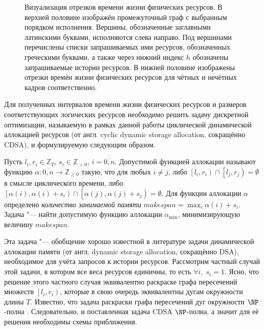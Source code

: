 \begin{figure*}[ht]
\caption{Визуализация отрезков времени жизни физических ресурсов.
В верхней половине изображён промежуточный граф с выбранным порядком исполнения.
Вершины, обозначенные заглавными латинскими буквами, исполняются слева направо.
Под вершинами перечислены списки запрашиваемых ими ресурсов, обозначенных греческими буквами, а также через нижний индекс $h$ обозначены запрашиваемые истории ресурсов.
В нижней половине изображены отрезки времён жизни физических ресурсов для чётных и нечётных кадров соответственно.}
\label{fig:twoFrameLifetime}
\end{figure*}
Для полученных интервалов времени жизни физических ресурсов и размеров соответствующих логических ресурсов необходимо решить задачу дискретной оптимизации, называемую в рамках данной работы циклической динамической аллокацией ресурсов (от англ. cyclic dynamic storage allocation, сокращённо CDSA), и формулируемую следующим образом.

Пусть $l_i, r_i \in \mathbb{Z}_T$, $s_i \in \mathbb{Z}_{>0}$, $i=\overline{0,n}$.
Допустимой функцией аллокации называют функцию $\alpha : \overline{0,n} \to \mathbb{Z}_{\geqslant 0}$ такую, что для любых $i \neq j$, либо $\left[l_i, r_i\right) \cap \left[l_j, r_j\right) = \emptyset$ в смысле циклического времени, либо $\left[\alpha(i), \alpha(i) + s_i\right) \cap \left[\alpha(j), \alpha(j) + s_j\right) = \emptyset$.
Для функции аллокации $\alpha$ определено \textit{количество занимаемой памяти} $makespan = \max_i \alpha(i) + s_i$.
Задача "--- найти допустимую функцию аллокации $\alpha_{\min}$, минимизирующую величину $makespan$.

Эта задача "--- обобщение хорошо известной в литературе задачи динамической аллокации памяти (от англ. dynamic storage allocation, сокращённо DSA), необходимое для учёта запросов к истории ресурсов.
Рассмотрим частный случай этой задачи, в котором все веса ресурсов единичны, то есть $\forall i,\;s_i = 1$.
Ясно, что решение этого частного случая эквивалентно раскраске графа пересечений множеств $\left[l_i, r_i\right)$, которые в свою очередь эквивалентны дугам окружности длины $T$.
Известно, что задача раскраски графа пересечений дуг окружности $\NP$-полна \cite{doi:10.1137/0601025}.
Следовательно, и поставленная задача CDSA $\NP$-полна, а значит для её решения необходимы схемы приближения.


